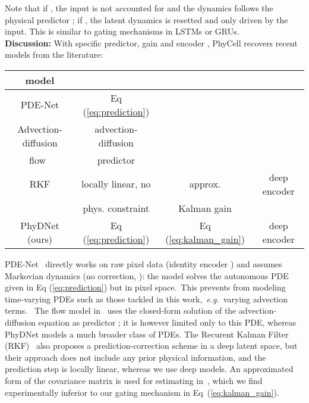 \documentclass[10pt,twocolumn,letterpaper]{article}
\def\eg{\textit{e.g.}~}
\begin{document}
Note that if , the input is not accounted for and the dynamics follows the physical predictor ; if , the latent dynamics is resetted and only driven  by the input. This is similar to gating mechanisms in LSTMs or GRUs. \vspace{0.25cm} \\ 
\textbf{Discussion:} With specific  predictor,   gain and  encoder , PhyCell recovers recent models from the literature:
\vspace{-0.2cm}
\begin{table}[H]
    \centering
        \begin{adjustbox}{max width=\columnwidth}
    \begin{tabular}{c|ccc}
    model &  &  &  \\ \hline
    PDE-Net \cite{long2019pde}    &  Eq (\ref{eq:prediction}) &  &      \\ \hline
    Advection-diffusion & advection-diffusion &  &   \\ 
    flow~\cite{de2017deep}  & predictor & &  \\ \hline
    RKF \cite{becker2019recurrent}  &  locally linear, no  & approx.   & deep encoder   \\
            ~   & phys. constraint     & Kalman gain  &  \\ \hline
            PhyDNet (ours) &  Eq (\ref{eq:prediction})  & Eq (\ref{eq:kalman_gain})  & deep encoder
    \end{tabular}
    \vspace{-0.2cm}
    \label{tab:my_label}
    \end{adjustbox}
\end{table}
\vspace{-0.2cm}
PDE-Net~\cite{long2018pde} directly works on raw pixel data (identity encoder ) and assumes Markovian dynamics (no correction, ): the model solves the autonomous PDE  given in Eq (\ref{eq:prediction}) but in pixel space.~This prevents from modeling time-varying PDEs such as those tackled in this work,~\eg  varying advection terms. ~The flow model in~\cite{de2017deep} uses the closed-form solution of the advection-diffusion equation as predictor ; it is however limited only to this PDE, whereas PhyDNet models a much broader class of PDEs. The Recurent Kalman Filter (RKF)~\cite{becker2019recurrent} also proposes a prediction-correction scheme in a deep latent space, but their approach does not include any prior physical information, and the prediction step is locally linear, whereas we use deep models. An approximated form of the covariance matrix is used for estimating  in~\cite{becker2019recurrent}, which we find experimentally inferior to our gating mechanism in Eq~(\ref{eq:kalman_gain}).
\end{document}
